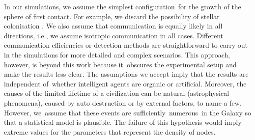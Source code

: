 \documentclass[crop]{CSLB}
\newcommand{\cetis}{CCNs}
\begin{document}

%
%


In our simulations, we assume the simplest configuration for the
growth of the sphere of first contact. For example, we discard the
possibility of stellar colonisation
\citep[e.g.][]{newman_galactic_1981, walters_interstellar_1980,
starling_virulence_2013, barlow_galactic_2012, jeong_large_2000,
maccone_mathematical_2011}. We also assume that communication is
equally likely in all directions, i.e., we assume isotropic
communication in all cases. Different communication efficiencies or
detection methods are straightforward to carry out in the simulations
for more detailed and complex scenarios. This approach, however, is
beyond this work because it obscures the experimental setup and make
the results less clear. The assumptions we accept imply that the
results are independent of whether intelligent agents are organic or
artificial. Moreover, the causes of the limited lifetime of a
civilization can be natural (astrophysical phenomena), caused by auto
destruction or by external factors, to name a few. However, we assume
that these events are sufficiently numerous in the Galaxy so that a
statistical model is plausible. The failure of this hypothesis would
imply extreme values for the parameters that represent the density of
nodes.






\end{document}
